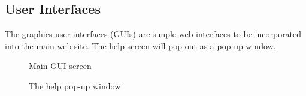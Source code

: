 \subsection{User Interfaces}
The graphics user interfaces (GUIs) are simple web interfaces to be incorporated into the main web site.  The help screen will pop out as a pop-up window.

\setlength\fboxrule{0.5pt}

\begin{figure}[H]

\caption{Main GUI screen}
\end{figure}


\begin{figure}[H]

\caption{The help pop-up window}
\end{figure}

